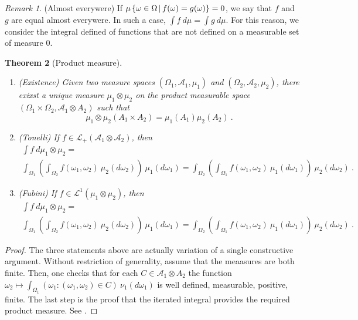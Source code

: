 \documentclass[12pt,a4paper]{amsart}
\theoremstyle{plain}
\newtheorem{theorem}{Theorem}%
\theoremstyle{definition}
\theoremstyle{remark}
\newtheorem{remark}[theorem]{Remark}
\begin{document}
\begin{remark}(Almost everywere) If $\mu\left\{\omega \in
    \Omega \, \middle| \, f(\omega) = g(\omega) \right\} = 0$, we say that $f$ and $g$ are
  equal almost everywere. In such a case, $\int f \ d\mu = \int g \
  d\mu$. For this reason, we consider the integral defined of
  functions that are not defined on a measurable set of measure 0.  
\end{remark}

\begin{theorem}[Product measure]\
  \begin{enumerate}
  \item (\emph{Existence)} Given two measure spaces $(\Omega_1,\mathcal A_1,\mu_1)$ and
    $(\Omega_2,\mathcal A_2,\mu_2)$, there exixst a unique 
    measure $\mu_1 \otimes \mu_2$ on the product measurable space
    $(\Omega_1 \times \Omega_2, \mathcal A_1 \otimes A_2)$ such that
    \begin{equation*}
      \mu_1 \otimes \mu_2 (A_1 \times A_2) = \mu_1(A_1) \mu_2(A_2) \ .
    \end{equation*}
\item (\emph{Tonelli}) If $f \in \mathcal L_+(\mathcal A_1 \otimes \mathcal A_2)$, then
  \begin{multline*}
    \int f \ d\mu_1\otimes\mu_2 = \\ \int_{\Omega_1} \left(\int_{\Omega_2}
    f(\omega_1,\omega_2)  \ \mu_2(d\omega_2)\right) \ \mu_1(d\omega_1)
  = \int_{\Omega_2} \left(\int_{\Omega_1}
    f(\omega_1,\omega_2)  \ \mu_1(d\omega_1)\right) \ \mu_2(d\omega_2)
  \ .
  \end{multline*}
\item (\emph{Fubini}) If $f \in \mathcal L^1(\mu_1 \otimes \mu_2)$, then
  \begin{multline*}
    \int f \ d\mu_1\otimes\mu_2 = \\ \int_{\Omega_1} \left(\int_{\Omega_2}
    f(\omega_1,\omega_2)  \ \mu_2(d\omega_2)\right) \ \mu_1(d\omega_1)
  = \int_{\Omega_2} \left(\int_{\Omega_1}
    f(\omega_1,\omega_2)  \ \mu_1(d\omega_1)\right) \ \mu_2(d\omega_2)
  \ .
  \end{multline*}
  \end{enumerate}
\end{theorem}

\begin{proof}
  The three statements above are actually variation of a single
  constructive argument. Without restriction of generality, assume
  that the meaasures are both finite. Then, one checks that for each
  $C \in \mathcal A_1 \otimes A_2$ the function
  $\omega_2 \mapsto \int_{\Omega_1} (\omega_1 \colon
  (\omega_1,\omega_2) \in C) \ \nu_1(d\omega_1)$ is well defined,
  measurable, positive, finite. The last step is the proof that the
  iterated integral provides the required product measure. See
  \cite[Sec. 8.1-9]{rudin:1987-3rd}.
\end{proof}
\end{document}
